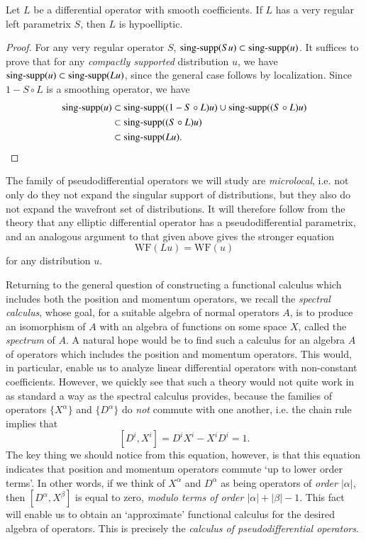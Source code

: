 \begin{theorem}
    Let $L$ be a differential operator with smooth coefficients. If $L$ has a very regular left parametrix $S$, then $L$ is hypoelliptic.
\end{theorem}
\begin{proof}
    For any very regular operator $S$, $\operatorname{\text{sing-supp}}(Su) \subset \operatorname{\text{sing-supp}}(u)$. It suffices to prove that for any \emph{compactly supported} distribution $u$, we have $\operatorname{\text{sing-supp}}(u) \subset \operatorname{\text{sing-supp}}(Lu)$, since the general case follows by localization. Since $1 - S \circ L$ is a smoothing operator, we have
    \begin{align*}
        \operatorname{\text{sing-supp}}(u) &\subset \operatorname{\text{sing-supp}}((1 - S \circ L) u) \cup \operatorname{\text{sing-supp}}((S \circ L) u)\\
        &\subset \operatorname{\text{sing-supp}}((S \circ L) u)\\
        &\subset \operatorname{\text{sing-supp}}(Lu). \qedhere
    \end{align*}
\end{proof}

The family of pseudodifferential operators we will study are \emph{microlocal}, i.e. not only do they not expand the singular support of distributions, but they also do not expand the wavefront set of distributions. It will therefore follow from the theory that any elliptic differential operator has a pseudodifferential parametrix, and an analogous argument to that given above gives the stronger equation
%
\[ \text{WF}(Lu) = \text{WF}(u) \]
%
for any distribution $u$.

Returning to the general question of constructing a functional calculus which includes both the position and momentum operators, we recall the \emph{spectral calculus}, whose goal, for a suitable algebra of normal operators $A$, is to produce an isomorphism of $A$ with an algebra of functions on some space $X$, called the \emph{spectrum} of $A$. A natural hope would be to find such a calculus for an algebra $A$ of operators which includes the position and momentum operators. This would, in particular, enable us to analyze linear differential operators with non-constant coefficients. However, we quickly see that such a theory would not quite work in as standard a way as the spectral calculus provides, because the families of operators $\{ X^\alpha \}$ and $\{ D^\alpha \}$ do \emph{not} commute with one another, i.e. the chain rule implies that
%
\[ [D^i,X^i] = D^i X^i - X^i D^i = 1. \]
%
The key thing we should notice from this equation, however, is that this equation indicates that position and momentum operators commute `up to lower order terms'. In other words, if we think of $X^\alpha$ and $D^\alpha$ as being operators of \emph{order $|\alpha|$}, then $[D^\alpha,X^\beta]$ is equal to zero, \emph{modulo terms of order $|\alpha| + |\beta| - 1$}. This fact will enable us to obtain an `approximate' functional calculus for the desired algebra of operators. This is precisely the \emph{calculus of pseudodifferential operators}.

